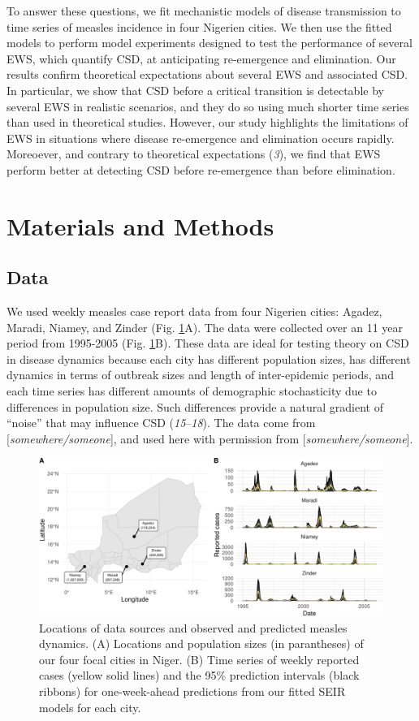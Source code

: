 \documentclass[3p]{elsarticle} %
\makeatletter
\def\maxwidth{\ifdim\Gin@nat@width>\linewidth\linewidth
\else\Gin@nat@width\fi}
\let\Oldincludegraphics\includegraphics
\renewcommand{\includegraphics}[1]{\Oldincludegraphics[width=\maxwidth]{#1}}
\makeatother
\begin{document}
To answer these questions, we fit mechanistic models of disease
transmission to time series of measles incidence in four Nigerien
cities. We then use the fitted models to perform model experiments
designed to test the performance of several EWS, which quantify CSD, at
anticipating re-emergence and elimination. Our results confirm
theoretical expectations about several EWS and associated CSD. In
particular, we show that CSD before a critical transition is detectable
by several EWS in realistic scenarios, and they do so using much shorter
time series than used in theoretical studies. However, our study
highlights the limitations of EWS in situations where disease
re-emergence and elimination occurs rapidly. Moreoever, and contrary to
theoretical expectations (\emph{3}), we find that EWS perform better at
detecting CSD before re-emergence than before elimination.

\section{Materials and Methods}\label{materials-and-methods}

\subsection{Data}\label{data}

We used weekly measles case report data from four Nigerien cities:
Agadez, Maradi, Niamey, and Zinder (Fig. \ref{data-plot}A). The data
were collected over an 11 year period from 1995-2005 (Fig.
\ref{data-plot}B). These data are ideal for testing theory on CSD in
disease dynamics because each city has different population sizes, has
different dynamics in terms of outbreak sizes and length of
inter-epidemic periods, and each time series has different amounts of
demographic stochasticity due to differences in population size. Such
differences provide a natural gradient of ``noise'' that may influence
CSD (\emph{15}--\emph{18}). The data come from
{[}\emph{somewhere/someone}{]}, and used here with permission from
{[}\emph{somewhere/someone}{]}.

\begin{figure}
\centering
\includegraphics{ms2_files/figure-latex/data-plot-1.pdf}
\caption{Locations of data sources and observed and predicted measles
dynamics. (A) Locations and population sizes (in parantheses) of our
four focal cities in Niger. (B) Time series of weekly reported cases
(yellow solid lines) and the 95\% prediction intervals (black ribbons)
for one-week-ahead predictions from our fitted SEIR models for each
city. \label{data-plot}}
\end{figure}
\end{document}
